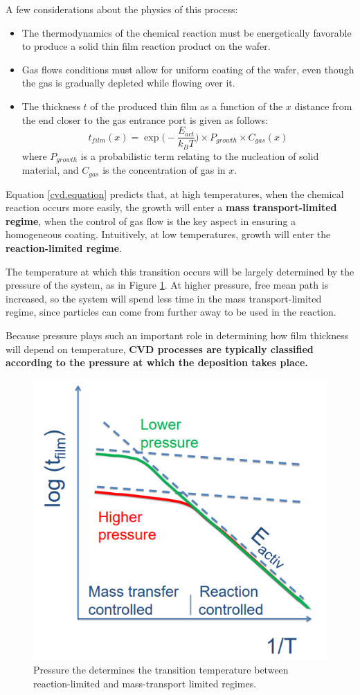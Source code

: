 \documentclass[12pt,a4paper]{report}
\begin{document}
A few considerations about the physics of this process:

\begin{itemize}
    \item The thermodynamics of the chemical reaction must be energetically favorable to produce a solid thin film reaction product on the wafer.
    \item Gas flows conditions must allow for uniform coating of the wafer, even though the gas is gradually depleted while flowing over it.
    \item The thickness $t$ of the produced thin film as a function of the $x$ distance from the end closer to the gas entrance port is given as follows:
    \begin{equation}
        t_{film}(x)=\exp\Big(-\frac{E_{act}}{k_BT}\Big) \times P_{growth}\times C_{gas}(x)
        \label{cvd.equation}
    \end{equation}
    where $P_{growth}$ is a probabilistic term relating to the nucleation of solid material, and $C_{gas}$ is the concentration of gas in $x$.
\end{itemize}

Equation \ref{cvd.equation} predicts that, at high temperatures, when the chemical reaction occurs more easily, the growth will enter a \textbf{mass transport-limited regime}, when the control of gas flow is the key aspect in ensuring a homogeneous coating. Intuitively, at low temperatures, growth will enter the \textbf{reaction-limited regime}.

The temperature at which this transition occurs will be largely determined by the pressure of the system, as in Figure \ref{cvd.regime}. At higher pressure, free mean path is increased, so the system will spend less time in the mass transport-limited regime, since particles can come from further away to be used in the reaction.

Because pressure plays such an important role in determining how film thickness will depend on temperature, \textbf{CVD processes are typically classified according to the pressure at which the deposition takes place.}

\begin{figure}[H]
    \centering
    \includegraphics[width=0.5\linewidth]{cvd regimes.png}
    \caption{Pressure the determines the transition temperature between reaction-limited and mass-transport limited regimes.}
    \label{cvd.regime}
\end{figure}
\end{document}
